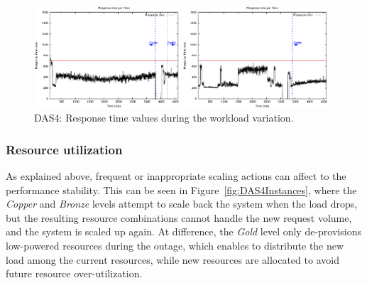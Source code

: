 \begin{figure}[htb]
\begin{minipage}[b]{0.19\linewidth}
	\end{minipage}
\begin{minipage}[b]{0.19\linewidth}
		\vspace{-3mm}
		\includegraphics[width=\linewidth,height=3.8cm]{images/exps2011/medium_up/das/proxyDataPoints_output.eps}
	\end{minipage}
\begin{minipage}[b]{0.20\linewidth}
		\vspace{-3mm}
		\includegraphics[width=\linewidth,height=3.8cm]{images/exps2011/high/das/proxyDataPoints_output.eps}
	\end{minipage}
\vspace{-5mm}
\caption{DAS4: Response time values during the workload variation.}
\label{fig:DAS4ResponseTime}
\end{figure}


\subsubsection{Resource utilization}

As explained above, frequent or inappropriate scaling actions can affect to the performance stability. This can be seen in Figure~\ref{fig:DAS4Instances}, where the \emph{Copper} and \emph{Bronze} levels attempt to scale back the system when the load drops, but the resulting resource combinations cannot handle the new request volume, and the system is scaled up again.  At difference, the \emph{Gold} level only de-provisions low-powered resources during the outage, which enables to distribute the new load among the current resources, while new resources are allocated to avoid future resource over-utilization. 

